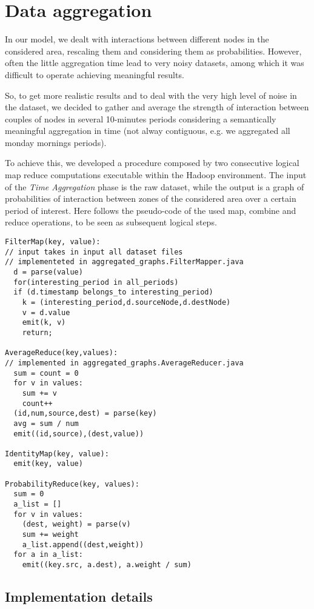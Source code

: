 \section{Data aggregation}
\label{aggregation}
In our model, we dealt with interactions between different nodes in the considered area, rescaling them and considering them as probabilities.
However, often the little aggregation time lead to very noisy datasets, among which it was difficult to operate achieving meaningful results.

So, to get more realistic results and to deal with the very high level of noise in the dataset,
we decided to gather and average the strength of interaction between couples of nodes in several 10-minutes periods
considering a semantically meaningful aggregation in time (not alway contiguous, e.g. we aggregated all monday
mornings periods).

To achieve this, we developed a procedure composed by two consecutive logical map reduce computations executable within the Hadoop environment.
The input of the \emph{Time Aggregation} phase is the raw dataset, while the output is a graph of probabilities of interaction between zones of the considered area
over a certain period of interest.
Here follows the pseudo-code of the used map, combine and reduce operations, to be seen as subsequent logical steps.
\begin{verbatim}
FilterMap(key, value):
// input takes in input all dataset files
// implementeted in aggregated_graphs.FilterMapper.java
  d = parse(value)
  for(interesting_period in all_periods)
  if (d.timestamp belongs_to interesting_period)
  	k = (interesting_period,d.sourceNode,d.destNode)
  	v = d.value
    emit(k, v)
    return;

AverageReduce(key,values):
// implemented in aggregated_graphs.AverageReducer.java
  sum = count = 0
  for v in values:
  	sum += v
  	count++
  (id,num,source,dest) = parse(key)
  avg = sum / num
  emit((id,source),(dest,value))

IdentityMap(key, value):
  emit(key, value)

ProbabilityReduce(key, values):
  sum = 0
  a_list = []
  for v in values:
    (dest, weight) = parse(v)
    sum += weight
  	a_list.append((dest,weight))
  for a in a_list:
    emit((key.src, a.dest), a.weight / sum)
\end{verbatim}

\subsection{Implementation details}

